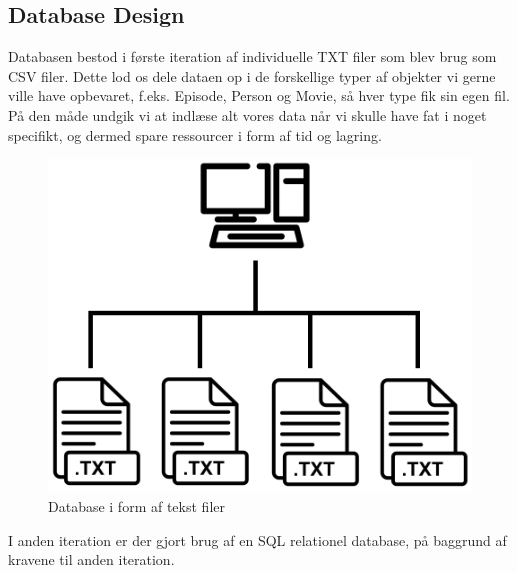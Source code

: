\newpage
\subsection{Database Design}
Databasen bestod i første iteration af individuelle TXT filer som blev brug som CSV filer. Dette lod os dele dataen op i de forskellige typer af objekter vi gerne ville have opbevaret, f.eks. Episode, Person og Movie, så hver type fik sin egen fil. På den måde undgik vi at indlæse alt vores data når vi skulle have fat i noget specifikt, og dermed spare ressourcer i form af tid og lagring.

\begin{figure}[H]
    \centering
\includegraphics[scale = 0.7]{images/computer_to_txt_file_icon.png}
\caption{Database i form af tekst filer}
\end{figure}

I anden iteration er der gjort brug af en SQL relationel database, på baggrund af kravene til anden iteration. 